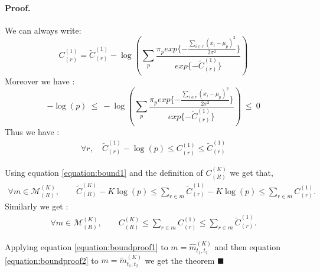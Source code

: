 \documentclass[article,10pt]{llncs}
\begin{document}
\paragraph{Proof.} 
We can always write:
$$ {C}_{(r)}^{(1)} = \widetilde{C}_{(r)}^{(1)} - \log\left(\sum_p \frac{\pi_p exp\{ - \frac{\sum_{i \in r} (x_i - \mu_p)^2 }{ 2 \sigma^2} \}}{exp\{-\widetilde{C}_{(r)}^{(1)}\}}\right)$$
Moreover we have :
$$-\log(p) \ \leq \ 
- \log\left(\sum_p \frac{\pi_p exp\{ - \frac{\sum_{i \in r} (x_i - \mu_p)^2 }{ 2 \sigma^2} \}}{exp\{-\widetilde{C}_{(r)}^{(1)}\}}\right) 
\ \leq \  
0$$
Thus we have :
\begin{eqnarray}
\forall r,  \quad \widetilde{C}_{(r)}^{(1)} -\log(p) \leq {C}_{(r)}^{(1)} \leq \widetilde{C}_{(r)}^{(1)} \label{equation:bound1}
\end{eqnarray}

Using equation \ref{equation:bound1} and the definition of ${C}_{(R)}^{(K)}$
we get that, 
\begin{eqnarray} 
\forall m \in \mathcal{M}^{(K)}_{(R)}, \qquad
\widetilde{C}_{(R)}^{(K)} - K\log(p) \leq \sum_{r \in m} \widetilde{C}_{(r)}^{(1)} - K \log(p) \leq   \sum_{r \in m} {C}_{(r)}^{(1)} .
\label{equation:boundproof1}\end{eqnarray}
Similarly we get :
\begin{eqnarray} 
\forall m \in \mathcal{M}^{(K)}_{(R)}, \qquad
{C}_{(R)}^{(K)} \leq \sum_{r \in m} {C}_{(r)}^{(1)} \leq   \sum_{r \in m} \widetilde{C}_{(r)}^{(1)} .
\label{equation:boundproof2}\end{eqnarray}

Applying equation \ref{equation:boundproof1} to $m = \widehat{m}_{t_1, t_2}^{(K)}$ and then equation \ref{equation:boundproof2}
to $m =  \widetilde{m}_{t_1, t_2}^{(K)}$ we get the theorem $\blacksquare$




\end{document}
